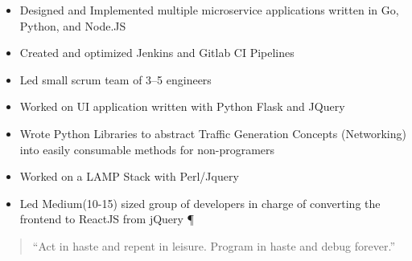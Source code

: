 \begin{itemize}
\item Designed and Implemented multiple microservice applications written in Go, Python, and Node.JS
\item Created and optimized Jenkins and Gitlab CI Pipelines
\item Led small scrum team of 3--5 engineers
\item Worked on UI application written with Python Flask and JQuery
\item Wrote Python Libraries to abstract Traffic Generation Concepts (Networking) into easily consumable methods for non-programers
\end{itemize}

\divider
{}
\begin{itemize}
\item Worked on a LAMP Stack with Perl/Jquery
\item Led Medium(10-15) sized group of developers in charge of converting the frontend to ReactJS from jQuery ¶
\end{itemize}


\smallskip
{}
\smallskip

\smallskip


\smallskip
{}

\smallskip


\smallskip


\smallskip


%

\divider

\begin{quote}
``Act in haste and repent in leisure.\newline
Program in haste and debug forever.''
\end{quote}
